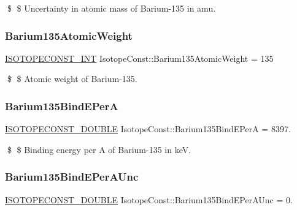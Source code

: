 \$ \$ Uncertainty in atomic mass of Barium-\/135 in amu. \mbox{\label{group___isotope_const-_barium-_ba135_ga418d494a0952d86ae7f0cd8d92811a1c}} 
\subsubsection{\texorpdfstring{Barium135\+Atomic\+Weight}{Barium135AtomicWeight}}
{\footnotesize\ttfamily \mbox{\hyperlink{group___isotope_const-_macros_ga5f18360b3e99483a35c32d789e62621c}{I\+S\+O\+T\+O\+P\+E\+C\+O\+N\+S\+T\+\_\+\+I\+NT}} Isotope\+Const\+::\+Barium135\+Atomic\+Weight = 135}

\$ \$ Atomic weight of Barium-\/135. \mbox{\label{group___isotope_const-_barium-_ba135_gae2eda39e5c5d8ef02a55d8bed7b80e0a}} 
\subsubsection{\texorpdfstring{Barium135\+Bind\+E\+PerA}{Barium135BindEPerA}}
{\footnotesize\ttfamily \mbox{\hyperlink{group___isotope_const-_macros_ga8f45a7272ce02c0b4c65c44636ed719a}{I\+S\+O\+T\+O\+P\+E\+C\+O\+N\+S\+T\+\_\+\+D\+O\+U\+B\+LE}} Isotope\+Const\+::\+Barium135\+Bind\+E\+PerA = 8397.}

\$ \$ Binding energy per A of Barium-\/135 in keV. \mbox{\label{group___isotope_const-_barium-_ba135_gaa7eaa3bce4df9821688e55ca39e65475}} 
\subsubsection{\texorpdfstring{Barium135\+Bind\+E\+Per\+A\+Unc}{Barium135BindEPerAUnc}}
{\footnotesize\ttfamily \mbox{\hyperlink{group___isotope_const-_macros_ga8f45a7272ce02c0b4c65c44636ed719a}{I\+S\+O\+T\+O\+P\+E\+C\+O\+N\+S\+T\+\_\+\+D\+O\+U\+B\+LE}} Isotope\+Const\+::\+Barium135\+Bind\+E\+Per\+A\+Unc = 0.}

